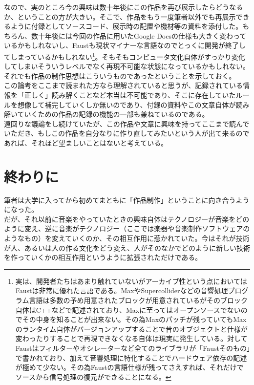 \documentclass[a4paper,report]{jsbook}
\begin{document}
なので、実のところ今の興味は数十年後にこの作品を再び展示したらどうなるか、ということの方が大きい。そこで、作品をもう一度筆者以外でも再展示できるように付録としてソースコード、展示時の配置や機材等の資料を添付した。もちろん、数十年後には今回の作品に用いたGoogle
Docsの仕様も大きく変わっているかもしれないし、Faustも現状マイナーな言語なのでとっくに開発が終了してしまっているかもしれない\footnote{実は、開発者たちはあまり触れていないがアーカイブ性という点においてはFaustは非常に優れた言語である。MaxやSupercolliderなどの音響処理プログラム言語は多数の予め用意されたブロックが用意されているがそのブロック自体はC++などで記述されており、Maxに至ってはオープンソースでないのでその中身を知ることが出来ない。その為Maxのパッチが残っていてもMaxのランタイム自体がバージョンアップすることで昔のオブジェクトと仕様が変わったりすることで再現できなくなる自体は現実に発生している。対してFaustはフィルターやオシレーターなど全てのライブラリが「Faustそのもの」で書かれており、加えて音響処理に特化することでハードウェア依存の記述が極めて少ない。その為Faustの言語仕様が残ってさえすれば、それだけでソースから信号処理の復元ができることになる。}。そもそもコンピュータ文化自体がすっかり変化してしまいそういうレベルでなく再現不可能な状態になっているかもしれない。それでも作品の制作思想はこういうものであったということを示しておく。\\
この論考をここまで読まれた方なら理解されていると思うが、記録されている情報を「正しく」読み解くことなど本当は不可能であり、そこに存在していたルールを想像して補完していくしか無いのであり、付録の資料やこの文章自体が読み解いていくための作品の記録の機能の一部も兼ねているのである。\\
遠回りな議論をし続けていたが、この作品や文章に興味を持ってここまで読んでいただき、もしこの作品を自分なりに作り直してみたいという人が出て来るのであれば、それほど望ましいことはないと考えている。

\section{終わりに}\label{ux7d42ux308fux308aux306b}

筆者は大学に入ってから初めてまともに「作品制作」ということに向き合うようになった。\\
だが、それ以前に音楽をやっていたときの興味自体はテクノロジーが音楽をどのように変え、逆に音楽がテクノロジー（ここでは楽器や音楽制作ソフトウェアのようなもの）を変えていくのか、その相互作用に惹かれていた。今はそれが技術が人、あるいは人の作る文化をどう変え、人がそのなかでどのように新しい技術を作っていくかの相互作用というように拡張されただけである。
\end{document}
